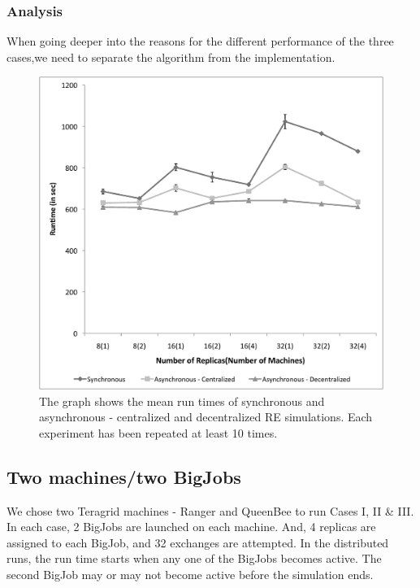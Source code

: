 \documentclass[a4paper,10pt]{article}
\begin{document}
\subsubsection{Analysis}

When going deeper into the reasons for the different performance of the three cases,we need to separate the algorithm from the implementation. 


%
\begin{figure}
\centering
\includegraphics[scale=0.30]{data/2BJ_comparison.pdf}
\caption{\small The graph shows the mean run times of synchronous and asynchronous - centralized and decentralized RE simulations. Each experiment has been repeated at least 10 times.}
\label{fig:graph2}
\vspace{-1em}
\end{figure}

\subsection{Two machines/two BigJobs}

We chose two Teragrid machines - Ranger and QueenBee to run Cases I, II \& III. In each case, 2 BigJobs are launched on each machine. And, 4 replicas are assigned to each BigJob, and 32 exchanges are attempted. In the distributed runs, the run time starts when any one of the BigJobs becomes active. The second BigJob may or may not become active before the simulation ends. 
\end{document}
